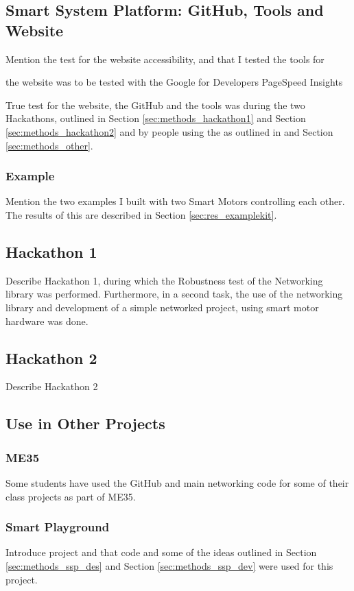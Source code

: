 \subsection{\label{sec:methods_tools}Smart System Platform: GitHub, Tools and Website}
Mention the test for the website accessibility, and that I tested the tools for 

the website was to be tested with the Google for Developers PageSpeed Insights

True test for the website, the GitHub and the tools was during the two Hackathons, outlined in Section \ref{sec:methods_hackathon1} and Section \ref{sec:methods_hackathon2} and by people using the as outlined in and Section \ref{sec:methods_other}.

\subsubsection{\label{sec:methods_example}Example}
Mention the two examples I built with two Smart Motors controlling each other. The results of this are described in Section \ref{sec:res_examplekit}.

\subsection{\label{sec:methods_hackathon1}Hackathon 1}

Describe Hackathon 1, during which the Robustness test of the Networking library was performed. 
Furthermore, in a second task, the use of the networking library and development of a simple networked project, using smart motor hardware was done. 

\subsection{\label{sec:methods_hackathon2}Hackathon 2}

Describe Hackathon 2

\subsection{\label{sec:methods_other}Use in Other Projects}

\subsubsection{\label{sec:methods_me35}ME35}
Some students have used the GitHub and main networking code for some of their class projects as part of ME35.

\subsubsection{\label{sec:methods_smart_playground}Smart Playground}
Introduce project and that code and some of the ideas outlined in Section \ref{sec:methods_ssp_des} and Section \ref{sec:methods_ssp_dev} were used for this project.

